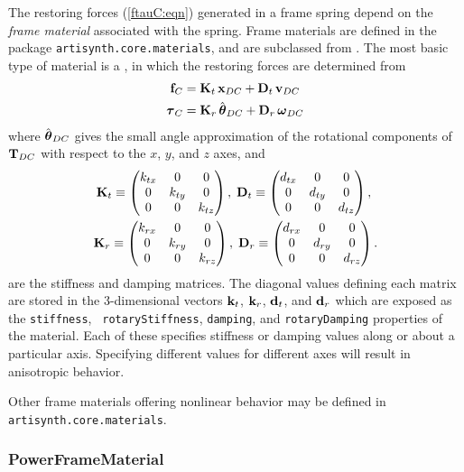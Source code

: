 The restoring forces (\ref{ftauC:eqn}) generated in a frame spring
depend on the {\it frame material} associated with the spring. Frame
materials are defined in the package {\tt artisynth.core.materials},
and are subclassed from
.
The most basic type of material is a 
,
in which the restoring forces are determined from
%
\begin{align*}
{\bf f}_C & = 
{\bf K}_{t} \, {\bf x}_{DC} + {\bf D}_{t} \, {\bf v}_{DC} \\
\boldsymbol\tau_C & = 
{\bf K}_{r} \, \hat{\boldsymbol\theta}_{DC} + {\bf D}_{r} \, \boldsymbol\omega_{DC}
\label{flinear:eqn}
\end{align*}
%
where $\hat{\boldsymbol\theta}_{DC}$ gives the small angle approximation of the
rotational components of ${\bf T}_{DC}$ with respect to the $x$, $y$, and
$z$ axes, and
%
\begin{gather*}
{\bf K}_{t} \equiv 
\left(\begin{matrix} k_{tx} & 0 & 0 \\ 0 & k_{ty} & 0 \\ 0 & 0 & k_{tz} \end{matrix}\right), \;
{\bf D}_{t} \equiv 
\left(\begin{matrix} d_{tx} & 0 & 0 \\ 0 & d_{ty} & 0 \\ 0 & 0 & d_{tz} \end{matrix}\right), \;\\
{\bf K}_{r} \equiv
\left(\begin{matrix} k_{r x} & 0 & 0 \\ 0 & k_{r y} & 0 \\ 0 & 0 & k_{r z} \end{matrix}\right), \;
{\bf D}_{r} \equiv
\left(\begin{matrix} d_{r x} & 0 & 0 \\ 0 & d_{r y} & 0 \\ 0 & 0 & d_{r z} \end{matrix}\right).
\end{gather*}
%
are the stiffness and damping matrices. The diagonal values defining
each matrix are stored in the 3-dimensional vectors ${\bf k}_t$, ${\bf k}_r$,
${\bf d}_t$, and ${\bf d}_r$ which are exposed as the {\tt stiffness}, {\tt
rotaryStiffness}, {\tt damping}, and {\tt rotaryDamping} properties of
the material. Each of these specifies stiffness or damping values
along or about a particular axis. Specifying different values for
different axes will result in anisotropic behavior.

Other frame materials offering nonlinear behavior may be defined in
{\tt artisynth.core.materials}.

\subsubsection{PowerFrameMaterial}
\label{PowerFrameMaterial:sec}

